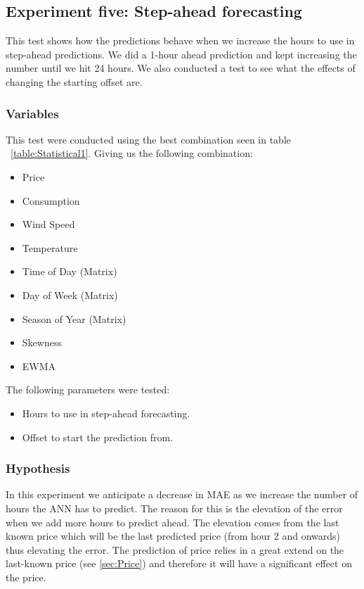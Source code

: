 \newpage
\subsection{Experiment five: Step-ahead forecasting}
\label{sec:priceExperimentFive}
This test shows how the predictions behave when we increase the hours to use in step-ahead predictions. We did a 1-hour ahead prediction and kept increasing the number until we hit 24 hours. We also conducted a test to see what the effects of changing the starting offset are.

\subsubsection{Variables}
This test were conducted using the best combination seen in table ~\ref{table:Statistical1}. Giving us the following combination:
\begin{itemize}
	\item Price
	\item Consumption
	\item Wind Speed
	\item Temperature
	\item Time of Day (Matrix)
	\item Day of Week (Matrix)
	\item Season of Year (Matrix)
	\item Skewness
	\item EWMA
\end{itemize}

The following parameters were tested:

\begin{itemize}
	\item Hours to use in step-ahead forecasting.
	\item Offset to start the prediction from.
\end{itemize}

\subsubsection{Hypothesis}
In this experiment we anticipate a decrease in MAE as we increase the number of hours the ANN has to predict. The reason for this is the elevation of the error when we add more hours to predict ahead. The elevation comes from the last known price which will be the last predicted price (from hour 2 and onwards) thus elevating the error. The prediction of price relies in a great extend on the last-known price (see \ref{sec:Price}) and therefore it will have a significant effect on the price.

